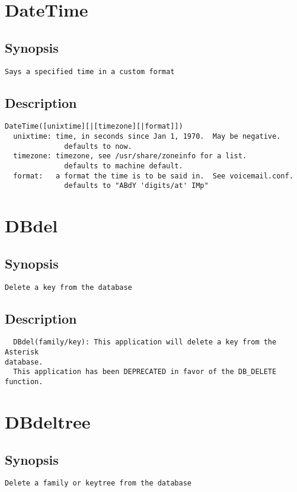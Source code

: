 \section{DateTime}
\subsection{Synopsis}
\begin{verbatim}
Says a specified time in a custom format
\end{verbatim}
\subsection{Description}
\begin{verbatim}
DateTime([unixtime][|[timezone][|format]])
  unixtime: time, in seconds since Jan 1, 1970.  May be negative.
              defaults to now.
  timezone: timezone, see /usr/share/zoneinfo for a list.
              defaults to machine default.
  format:   a format the time is to be said in.  See voicemail.conf.
              defaults to "ABdY 'digits/at' IMp"

\end{verbatim}


\section{DBdel}
\subsection{Synopsis}
\begin{verbatim}
Delete a key from the database
\end{verbatim}
\subsection{Description}
\begin{verbatim}
  DBdel(family/key): This application will delete a key from the Asterisk
database.
  This application has been DEPRECATED in favor of the DB_DELETE function.

\end{verbatim}


\section{DBdeltree}
\subsection{Synopsis}
\begin{verbatim}
Delete a family or keytree from the database
\end{verbatim}

